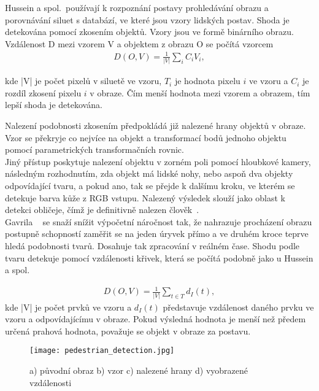 Hussein a spol.~\cite{9}používají k rozpoznání postavy prohledávání obrazu a porovnávání siluet s databází, ve které jsou vzory lidských postav. Shoda je detekována pomocí zkosením objektů. Vzory jsou ve formě binárního obrazu. Vzdálenost D mezi vzorem V a objektem z obrazu O se počítá vzorcem\\

\begin{eqnarray}
 D(O,V) = \frac{1}{|V|}\sum_{i}^{}C_{i}V_{i} ,
\end{eqnarray}

kde |V| je počet pixelů v siluetě ve vzoru, $ T_{i} $ je hodnota pixelu $ i $ ve vzoru a $ C_{i} $ je rozdíl zkosení pixelu $ i $ v obraze. Čím menší hodnota mezi vzorem a obrazem, tím lepší shoda je detekována.

Nalezení podobnosti zkosením předpokládá již nalezené hrany objektů v obraze. Vzor se překryje co nejvíce na objekt a transformací bodů jednoho objektu pomocí parametrických transformačních rovnic.\\

Jiný přístup poskytuje nalezení objektu v zorném poli pomocí hloubkové kamery, následným rozhodnutím, zda objekt má lidské nohy, nebo aspoň dva objekty odpovídající tvaru, a pokud ano, tak se přejde k dalšímu kroku, ve kterém se detekuje barva kůže z RGB vstupu. Nalezený výsledek slouží jako oblast k detekci obličeje, čímž je definitivně nalezen člověk~\cite{10}.\\

Gavrila ~\cite{7} se snaží snížit výpočetní náročnost tak, že nahrazuje procházení obrazu postupně schopností zaměřit se na jeden úryvek přímo a ve druhém kroce teprve hledá podobnosti tvarů. Dosahuje tak zpracování v reálném čase.
Shodu podle tvaru detekuje pomocí vzdálenosti křivek, která se počítá podobně jako u Hussein a spol.~\cite{9} 

\begin{eqnarray}
 D(O,V) = \frac{1}{|V|}\sum_{t\in T}^{}d_{I}(t) ,
\end{eqnarray}
kde |V| je počet prvků ve vzoru a $ d_{I}(t) $ představuje vzdálenost daného prvku ve vzoru a odpovídajícímu v obraze. Pokud výsledná hodnota je menší než předem určená prahová hodnota, považuje se objekt v obraze za postavu. 

\begin{figure}[h]
\centering
\texttt{[image: pedestrian\_detection.jpg]}
\caption{a) původní obraz b) vzor c) nalezené hrany d) vyobrazené vzdálenosti~\cite{7} }
\end{figure}

